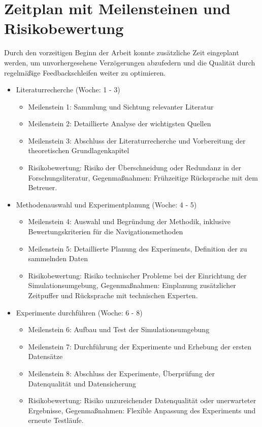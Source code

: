 \section{Zeitplan mit Meilensteinen und Risikobewertung}
Durch den vorzeitigen Beginn der Arbeit konnte zusätzliche Zeit eingeplant werden, um unvorhergesehene Verzögerungen abzufedern und die Qualität durch regelmäßige Feedbackschleifen weiter zu optimieren. \cite{ChatGPT2024}

\begin{itemize}
\item Literaturrecherche (Woche: 1 - 3) \cite{ChatGPT2024}
\begin{itemize}
\item Meilenstein 1: Sammlung und Sichtung relevanter Literatur \cite{ChatGPT2024}
\item Meilenstein 2: Detaillierte Analyse der wichtigsten Quellen \cite{ChatGPT2024}
\item Meilenstein 3: Abschluss der Literaturrecherche und Vorbereitung der theoretischen Grundlagenkapitel \cite{ChatGPT2024}
\item Risikobewertung: Risiko der Überschneidung oder Redundanz in der Forschungsliteratur, Gegenmaßnahmen: Frühzeitige Rücksprache mit dem Betreuer. \cite{ChatGPT2024}
\end{itemize}

\item Methodenauswahl und Experimentplanung (Woche: 4 - 5) \cite{ChatGPT2024}
\begin{itemize}
  \item Meilenstein 4: Auswahl und Begründung der Methodik, inklusive Bewertungskriterien für die Navigationsmethoden \cite{ChatGPT2024}
    \item Meilenstein 5: Detaillierte Planung des Experiments, Definition der zu sammelnden Daten \cite{ChatGPT2024}
    \item Risikobewertung: Risiko technischer Probleme bei der Einrichtung der Simulationsumgebung, Gegenmaßnahmen: Einplanung zusätzlicher Zeitpuffer und Rücksprache mit technischen Experten. \cite{ChatGPT2024}
\end{itemize}

\item Experimente durchführen (Woche: 6 - 8) \cite{ChatGPT2024}
\begin{itemize}
    \item Meilenstein 6: Aufbau und Test der Simulationsumgebung \cite{ChatGPT2024}
    \item Meilenstein 7: Durchführung der Experimente und Erhebung der ersten Datensätze \cite{ChatGPT2024}
    \item Meilenstein 8: Abschluss der Experimente, Überprüfung der Datenqualität und Datensicherung \cite{ChatGPT2024}
    \item Risikobewertung: Risiko unzureichender Datenqualität oder unerwarteter Ergebnisse, Gegenmaßnahmen: Flexible Anpassung des Experiments und erneute Testläufe. \cite{ChatGPT2024}
\end{itemize}


\end{itemize}

